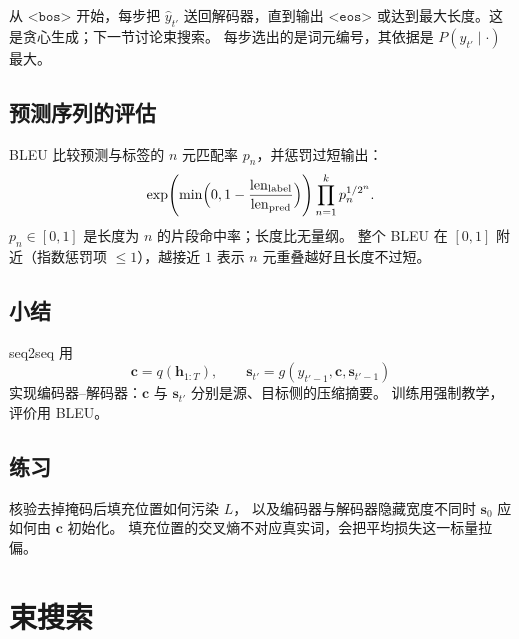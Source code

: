 从 $\texttt{<bos>}$ 开始，每步把 $\hat{y}_{t'}$ 送回解码器，直到输出 $\texttt{<eos>}$
或达到最大长度。这是贪心生成；下一节讨论束搜索。
每步选出的是词元编号，其依据是 $P(y_{t'}\mid\cdot)$ 最大。

\subsection{预测序列的评估}

BLEU 比较预测与标签的 $n$ 元匹配率 $p_n$，并惩罚过短输出：
\[
\exp\Biggl(
\min\Bigl(0,1-\frac{\mathrm{len}_{\mathrm{label}}}{\mathrm{len}_{\mathrm{pred}}}\Bigr)
\Biggr)
\prod_{n=1}^{k}p_n^{1/2^{n}}.
\]
$p_n\in[0,1]$ 是长度为 $n$ 的片段命中率；长度比无量纲。
整个 BLEU 在 $[0,1]$ 附近（指数惩罚项 $\le 1$），越接近 $1$ 表示 $n$ 元重叠越好且长度不过短。

\subsection{小结}

seq2seq 用
\[
\bm{c}=q(\bm{h}_{1:T}),
\qquad
\bm{s}_{t'}=g(y_{t'-1},\bm{c},\bm{s}_{t'-1})
\]
实现编码器--解码器：$\bm{c}$ 与 $\bm{s}_{t'}$ 分别是源、目标侧的压缩摘要。
训练用强制教学，评价用 BLEU。

\subsection{练习}

核验去掉掩码后填充位置如何污染 $L$，
以及编码器与解码器隐藏宽度不同时 $\bm{s}_0$ 应如何由 $\bm{c}$ 初始化。
填充位置的交叉熵不对应真实词，会把平均损失这一标量拉偏。

\section{束搜索}





